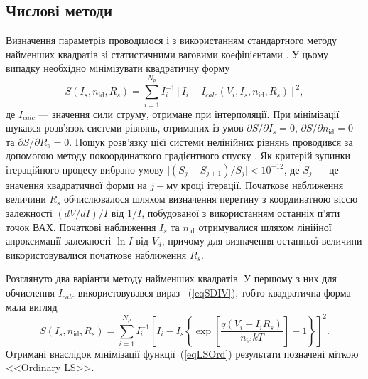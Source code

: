 \subsection{Числові методи}
Визначення параметрів проводилося і з використанням стандартного методу найменших квадратів зі статистичними ваговими коефіцієнтами \cite[с.~67]{KalitkinBook}.
У цьому випадку необхідно мінімізувати квадратичну форму
\begin{equation}
\label{eqLS}
S(I_s,n_\mathrm{id},R_s)=\sum_{i=1}^{N_p}I_i^{-1}\left[I_i-I_{calc}(V_i,I_s,n_\mathrm{id},R_s)\right]^2,
\end{equation}
де $I_{calc}$ --- значення сили струму, отримане при інтерполяції.
При мінімізації шукався розв'язок системи рівнянь, отриманих із умов $\partial S/\partial I_s=0$,
$\partial S/\partial n_\mathrm{id}=0$ та $\partial S/\partial R_s=0$.
Пошук розв'язку цієї системи нелінійних рівнянь проводився за допомогою методу покоординаткого градієнтного спуску \cite[с.~231]{KalitkinBook}.
Як критерій зупинки ітераційного процесу вибрано умову $\mid(S_j-S_{j+1})/S_j\mid<10^{-12}$,
де $S_j$ --- це значення квадратичної форми на $j-$му кроці ітерації.
Початкове наближення величини $R_s$ обчислювалося шляхом визначення перетину з координатною віссю залежності $(dV/dI)/I$ від $1/I$,
побудованої з використанням останніх п'яти точок ВАХ.
Початкові наближення $I_s$ та $n_\mathrm{id}$ отримувалися шляхом лінійної апроксимації залежності $\ln I$ від $V_d$, причому для визначення останньої величини використовувалися початкове наближення  $R_s$.

Розглянуто два варіанти методу найменших квадратів.
У першому з них для обчислення $I_{calc}$ використовувався вираз ~(\ref{eqSDIV}), тобто квадратична форма мала вигляд
\begin{equation}
\label{eqLSOrd}
S(I_s,n_\mathrm{id},R_s)=\sum_{i=1}^{N_p}I_i^{-1}\left[I_i-I_s\left\{\exp\left[\frac{q(V_i-I_iR_s)}{n_\mathrm{id}kT}\right]-1\right\}\right]^2.
\end{equation}
Отримані внаслідок мінімізації функції~(\ref{eqLSOrd}) результати позначені міткою <<Ordinary LS>>.

